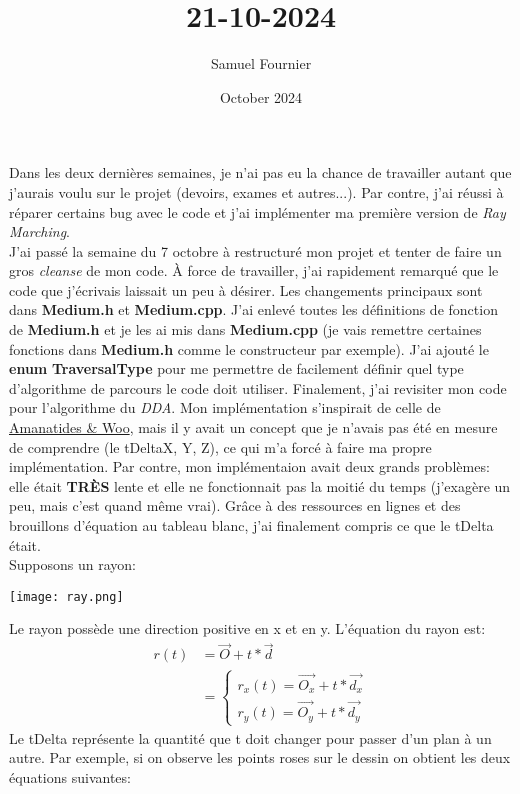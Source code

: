 \documentclass{article}
\title{21-10-2024}
\author{Samuel Fournier}
\date{October 2024}
\begin{document}
\maketitle

Dans les deux dernières semaines, je n'ai pas eu la chance de travailler autant que j'aurais voulu sur le projet (devoirs, exames et autres...). Par contre, j'ai réussi à réparer certains bug avec le code et j'ai implémenter ma première version de \textit{Ray Marching}. \\
J'ai passé la semaine du 7 octobre à restructuré mon projet et tenter de faire un gros \textit{cleanse} de mon code. À force de travailler, j'ai rapidement remarqué que le code que j'écrivais laissait un peu à désirer. Les changements principaux sont dans \textbf{Medium.h} et \textbf{Medium.cpp}. J'ai enlevé toutes les définitions de fonction de \textbf{Medium.h} et je les ai mis dans \textbf{Medium.cpp} (je vais remettre certaines fonctions dans \textbf{Medium.h} comme le constructeur par exemple). J'ai ajouté le \textbf{enum} \textbf{TraversalType} pour me permettre de facilement définir quel type d'algorithme de parcours le code doit utiliser. Finalement, j'ai revisiter mon code pour l'algorithme du \textit{DDA}. Mon implémentation s'inspirait de celle de \href{http://www.cse.yorku.ca/~amana/research/grid.pdf}{Amanatides \& Woo}, mais il y avait un concept que je n'avais pas été en mesure de comprendre (le tDeltaX, Y, Z), ce qui m'a forcé à faire ma propre implémentation. Par contre, mon implémentaion avait deux grands problèmes: elle était \textbf{TRÈS} lente et elle ne fonctionnait pas la moitié du temps (j'exagère un peu, mais c'est quand même vrai). Grâce à des ressources en lignes et des brouillons d'équation au tableau blanc, j'ai finalement compris ce que le tDelta était. \\
Supposons un rayon:
\begin{center}
    \texttt{[image: ray.png]}
\end{center}
Le rayon possède une direction positive en x et en y. L'équation du rayon est:
\begin{align*}
    r(t) &= \vec{O} + t * \vec{d} \\
    &= \begin{cases}
      r_x(t) = \vec{O_x} + t * \vec{d_x} \\
      r_y(t) = \vec{O_y} + t * \vec{d_y}
   \end{cases}
\end{align*}
Le tDelta représente la quantité que t doit changer pour passer d'un plan à un autre. Par exemple, si on observe les points roses sur le dessin on obtient les deux équations suivantes:
\end{document}
